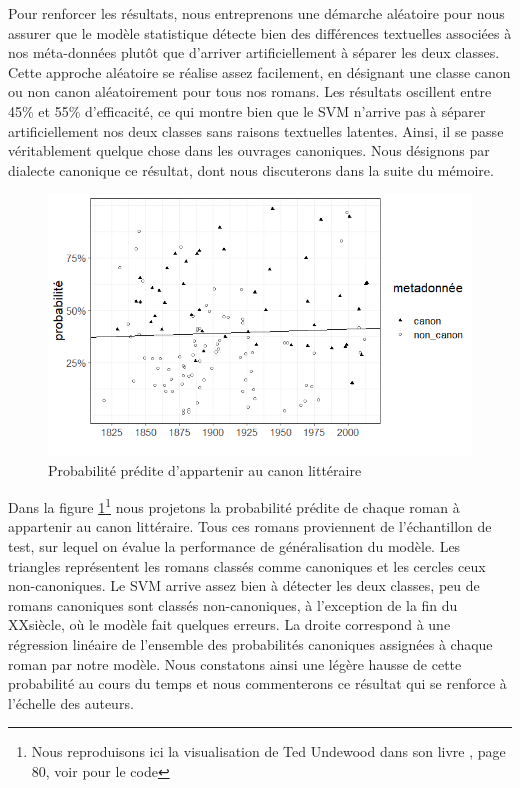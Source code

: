 Pour renforcer les résultats, nous entreprenons une démarche aléatoire pour nous assurer que le modèle statistique détecte bien des différences textuelles associées à nos méta-données plutôt que d'arriver artificiellement à séparer les deux classes. Cette approche aléatoire se réalise assez facilement, en désignant une classe canon ou non canon aléatoirement pour tous nos romans. Les résultats oscillent entre 45\% et 55\% d'efficacité, ce qui montre bien que le SVM n'arrive pas à séparer artificiellement nos deux classes sans raisons textuelles latentes. Ainsi, il se passe véritablement quelque chose dans les ouvrages canoniques. Nous désignons par dialecte canonique ce résultat, dont nous discuterons dans la suite du mémoire. 

\bigskip
\begin{figure}[!ht]
    \centering
    \includegraphics[width=15cm]{img/08_main_vis_svm.png}
    \caption{Probabilité prédite d'appartenir au canon littéraire}
    \label{svm_novel}
\end{figure}

Dans la figure \ref{svm_novel}\footnote{Nous reproduisons ici la visualisation de Ted Undewood dans son livre \cite{underwood_distant_2019}, page 80, voir \cite{underwood_tedunderwoodhorizon_2018} pour le code} nous projetons la probabilité prédite de chaque roman à appartenir au canon littéraire. Tous ces romans proviennent de l'échantillon de test, sur lequel on évalue la performance de généralisation du modèle. Les triangles représentent les romans classés comme canoniques et les cercles ceux non-canoniques. Le SVM arrive assez bien à détecter les deux classes, peu de romans canoniques sont classés non-canoniques, à l'exception de la fin du XX\ieme siècle, où le modèle fait quelques erreurs. La droite correspond à une régression linéaire de l'ensemble des probabilités canoniques assignées à chaque roman par notre modèle. Nous constatons ainsi une légère hausse de cette probabilité au cours du temps et nous commenterons ce résultat qui se renforce à l'échelle des auteurs.



